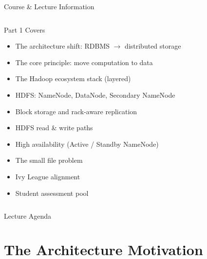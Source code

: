 \documentclass[aspectratio=169,10pt]{beamer}
\begin{document}
\begin{frame}{Course \& Lecture Information}
\begin{columns}[T]
      \begin{exampleblock}{Part 1 Covers}
        \begin{itemize}
          \item The architecture shift: RDBMS $\to$ distributed storage
          \item The core principle: move computation to data
          \item The Hadoop ecosystem stack (layered)
          \item HDFS: NameNode, DataNode, Secondary NameNode
          \item Block storage and rack-aware replication
          \item HDFS read \& write paths
          \item High availability (Active / Standby NameNode)
          \item The small file problem
          \item Ivy League alignment
          \item Student assessment pool
        \end{itemize}
      \end{exampleblock}
  \end{columns}
\end{frame}

\begin{frame}{Lecture Agenda}
  \tableofcontents
\end{frame}

\section{The Architecture Motivation}
\end{document}

